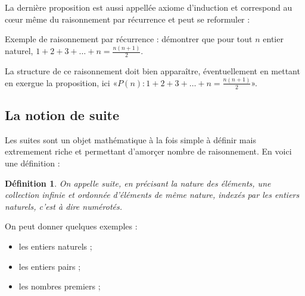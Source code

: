 \documentclass[12pt,a4paper]{article}
\theoremstyle{break}
\newtheorem{definition}{Définition}
\theoremstyle{plain}
\theoremstyle{nonumberplain}
\theoremstyle{nonumberbreak}
\begin{document}

La dernière proposition est aussi appellée axiome d'induction et
correspond au cœur même du raisonnement par récurrence et peut se
reformuler :


Exemple de raisonnement par récurrence : démontrer que pour tout $n$
entier naturel, $1 + 2 + 3 + \dots + n = \frac{n(n+1)}2$.


La structure de ce raisonnement doit bien apparaître, éventuellement en
mettant en exergue la proposition, ici «$P(n) : 1 + 2 + 3 + \dots + n =
\frac{n(n+1)}2$».

\subsection{La notion de suite}

Les suites sont un objet mathématique à la fois simple à définir mais
extremement riche et permettant d'amorçer nombre de raisonnement. En
voici une définition :
\begin{definition}
  On appelle \emph{suite}, en précisant la nature des éléments, une
  collection infinie et ordonnée d'éléments de même nature, indexés par
  les entiers naturels, c'est à dire numérotés.
\end{definition}

On peut donner quelques exemples :
\begin{itemize}
  \item les entiers naturels ;
  \item les entiers pairs ;
  \item les nombres premiers ;
\end{itemize}
\end{document}
